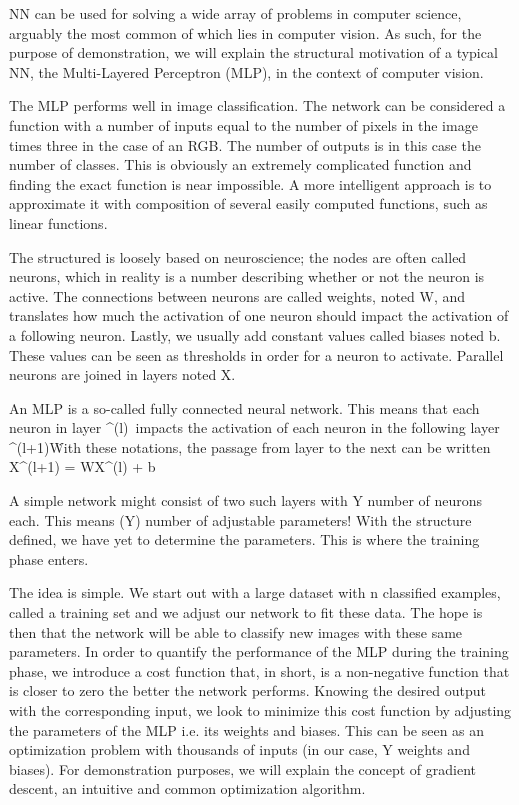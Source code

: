 \startsection[title=Classical Neural Networks ({\small Multilayer Perceptron})]
NN can be used for solving a wide array of problems in computer science, arguably the most common of which lies in computer vision.
 As such, for the purpose of demonstration, we will explain the structural motivation of a typical NN, the Multi-Layered Perceptron (MLP), in the context of computer vision.  

The MLP performs well in image classification. 
The network can be considered a function with a number of inputs equal to the number of pixels in the image times three in the case of an RGB.
The number of outputs is in this case the number of classes.
This is obviously an extremely complicated function and finding the exact function is near impossible.
A more intelligent approach is to approximate it with composition of several easily computed functions, such as linear functions.


The structured is loosely based on neuroscience; the nodes are often called neurons, which in reality is a number describing whether or not the neuron is active.
The connections between neurons are called weights, noted W, and translates how much the activation of one neuron should impact the activation of a following neuron.
Lastly, we usually add constant values called biases noted b. 
These values can be seen as thresholds in order for a neuron to activate. 
Parallel neurons are joined in layers noted X.

An MLP is a so-called fully connected neural network. 
This means that each neuron in layer \X^(l)\, impacts the activation of each neuron in the following layer \X^(l+1)\.
With these notations, the passage from layer to the next can be written
\startformula
X^(l+1) = WX^(l) + b
\stopformula
  
A simple network might consist of two such layers with Y number of neurons each.
This means (Y) number of adjustable parameters! With the structure defined, we have yet to determine the parameters.
This is where the training phase enters.  

\startsubsection[title=Training phase]
The idea is simple. We start out with a large dataset with n classified examples, called a training set and we adjust our network to fit these data.
The hope is then that the network will be able to classify new images with these same parameters.
In order to quantify the performance of the MLP during the training phase, we introduce a cost function that, in short, is a non-negative function that is closer to zero the better the network performs.
Knowing the desired output with the corresponding input, we look to minimize this cost function by adjusting the parameters of the MLP i.e. its weights and biases.
This can be seen as an optimization problem with thousands of inputs (in our case, Y weights and biases).
For demonstration purposes, we will explain the concept of gradient descent, an intuitive and common optimization algorithm.  
\stopsubsection

